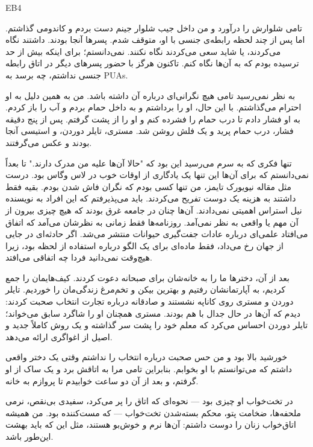 EB4

تامی شلوارش را درآورد و من داخل جیب شلوار جینم دست بردم و کاندومی گذاشتم. اما پس از چند لحظه رابطه‌ی جنسی با او، متوقف شدم. پسرها آنجا بودند. داشتند نگاه می‌کردند، یا شاید سعی می‌کردند نگاه نکنند. نمی‌دانستم؛ برای اینکه بیش از حد ترسیده بودم که به آن‌ها نگاه کنم. تاکنون هرگز با حضور پسرهای دیگر در اتاق رابطه جنسی نداشتم، چه برسد به PUAs.

به نظر نمی‌رسید تامی هیچ نگرانی‌ای درباره آن داشته باشد. من به همین دلیل به او احترام می‌گذاشتم. با این حال، او را برداشتم و به داخل حمام بردم و آب را باز کردم. به او فشار دادم تا درب حمام را فشرده کنم و او را از پشت گرفتم. پس از پنج دقیقه فشار، درب حمام پرید و یک فلش روشن شد. مستری، تایلر دوردن، و استیسی آنجا بودند و عکس می‌گرفتند.

تنها فکری که به سرم می‌رسید این بود که "حالا آن‌ها علیه من مدرک دارند." تا بعداً نمی‌دانستم که برای آن‌ها این تنها یک یادگاری از اوقات خوب در لاس وگاس بود. درست مثل مقاله نیویورک تایمز، من تنها کسی بودم که نگران فاش شدن بودم. بقیه فقط داشتند به هزینه یک دوست تفریح می‌کردند. باید می‌پذیرفتم که این افراد به نویسنده نیل استراس اهمیتی نمی‌دادند. آن‌ها چنان در جامعه غرق بودند که هیچ چیزی بیرون از آن مهم یا واقعی به نظر نمی‌آمد. روزنامه‌ها فقط زمانی به نظرشان می‌آمد که اتفاق می‌افتاد علمی‌ای درباره عادات جفت‌گیری حیوانات منتشر می‌شد. اگر حادثه‌ای در جایی از جهان رخ می‌داد، فقط ماده‌ای برای یک الگو درباره استفاده از لحظه بود، زیرا هیچ‌وقت نمی‌دانید فردا چه اتفاقی می‌افتد.

بعد از آن، دخترها ما را به خانه‌شان برای صبحانه دعوت کردند. کیف‌هایمان را جمع کردیم، به آپارتمانشان رفتیم و بهترین بیکن و تخم‌مرغ زندگی‌مان را خوردیم. تایلر دوردن و مستری روی کاناپه نشستند و صادقانه درباره تجارت انتخاب صحبت کردند: دیدم که آن‌ها در حال جدال با هم بودند. مستری همچنان او را شاگرد سابق می‌خواند؛ تایلر دوردن احساس می‌کرد که معلم خود را پشت سر گذاشته و یک روش کاملاً جدید و اصیل از اغواگری ارائه می‌دهد.

خورشید بالا بود و من حس صحبت درباره انتخاب را نداشتم وقتی یک دختر واقعی داشتم که می‌توانستم با او بخوابم. بنابراین تامی مرا به اتاقش برد و یک ساک از او گرفتم، و بعد از آن دو ساعت خوابیدم تا پروازم به خانه.

در تخت‌خواب او چیزی بود — نحوه‌ای که اتاق را پر می‌کرد، سفیدی بی‌نقص، نرمی ملحفه‌ها، ضخامت پتو، محکم بسته‌شدن تخت‌خواب — که مست‌کننده بود. من همیشه اتاق‌خواب زنان را دوست داشتم: آن‌ها نرم و خوش‌بو هستند، مثل این که باید بهشت این‌طور باشد.